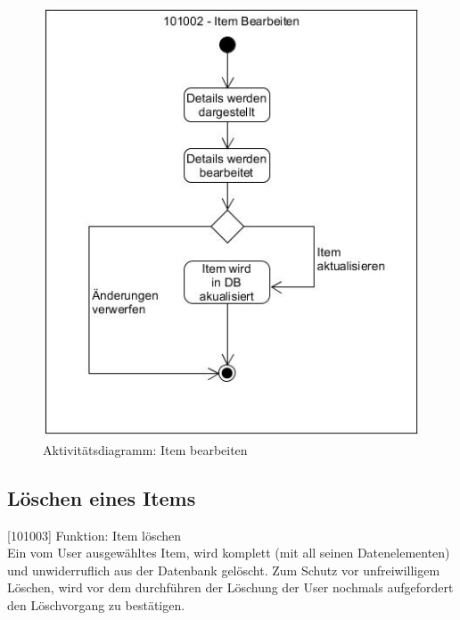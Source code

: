 \begin{figure}[htbp]
	\centering
	\includegraphics[scale=0.6]{pic/101002}
	\caption{Aktivitätsdiagramm: Item bearbeiten}
\end{figure}

\subsection{Löschen eines Items}

[101003] Funktion: Item löschen\\

Ein vom User ausgewähltes Item, wird komplett (mit all seinen Datenelementen) und unwiderruflich aus der Datenbank gelöscht. Zum Schutz vor unfreiwilligem Löschen, wird vor dem durchführen der Löschung der User nochmals aufgefordert den Löschvorgang zu bestätigen.

